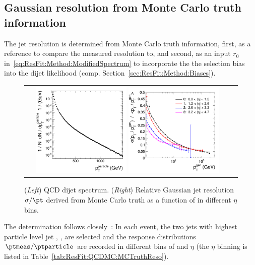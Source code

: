 \subsection{Gaussian resolution from Monte Carlo truth information}\label{sec:ResFit:QCDMC:MCTruthReso}

The jet \pt resolution is determined from Monte Carlo truth information, first, as a reference to compare the measured resolution to, and second, as an input $r_{0}$ in~\eqref{eq:ResFit:Method:ModifiedSpectrum} to incorporate the the selection bias into the dijet likelihood (comp. Section~\ref{sec:ResFit:Method:Biases}).
\begin{figure}[ht]
  \centering
  \begin{tabular}{cc}
    \includegraphics[width=0.45\textwidth]{figures/resFit_QCD_MCSpectrum}
    \includegraphics[width=0.45\textwidth]{figures/resFit_QCD_MCTruthResolution}
  \end{tabular}
  \caption{(\textit{Left}) QCD dijet \ptparticle spectrum. (\textit{Right}) Relative Gaussian jet \pt resolution $\sigma/\pt$ derived from Monte Carlo truth as a function of \pt in different $\eta$ bins.}
  \label{fig:ResFit:QCDMC:MCTruthReso}
\end{figure}
The determination follows closely~\cite{bib:cmsan:mcjer}:
In each event, the two jets with highest particle level jet \pt, \ptparticle, are selected and the response distributions \mbox{$\ptmeas / \ptparticle$} are recorded in different bins of \ptparticle and $\eta$ (the $\eta$ binning is listed in Table~\ref{tab:ResFit:QCDMC:MCTruthReso}).
